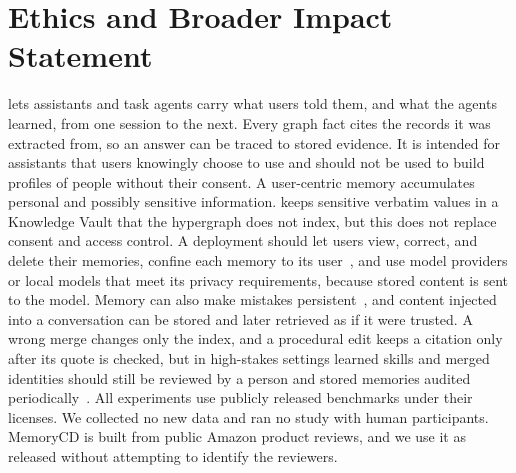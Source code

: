 \section*{Ethics and Broader Impact Statement}

\ours lets assistants and task agents carry what users told them, and what the
agents learned, from one session to the next. Every graph fact cites the records it was
extracted from, so an answer can be traced to stored evidence.
It is intended for assistants that users knowingly choose to use and should
not be used to build profiles of people without their consent. A user-centric
memory accumulates personal and possibly sensitive information. \ours keeps
sensitive verbatim values in a Knowledge Vault that the hypergraph does not
index, but this does not replace consent and access control. A deployment
should let users view, correct, and delete their memories, confine each memory
to its user~\citep{rezazadeh2025collabmemory}, and use model providers or local
models that meet its privacy requirements, because stored content is sent to
the model. Memory can also make mistakes
persistent~\citep{zhang2026faultymemories,shang2026backfires}, and content
injected into a conversation can be stored and later retrieved as if it were
trusted. A wrong merge
changes only the index, and a procedural edit keeps a citation only after its
quote is checked, but in high-stakes settings learned skills and merged
identities should still be reviewed by a person and stored memories audited
periodically~\citep{ma2026memaudit}. All experiments use publicly released
benchmarks under their licenses. We collected no new data and ran no study with human participants.
MemoryCD is built from public Amazon product reviews, and we use it as
released without attempting to identify the reviewers. 
